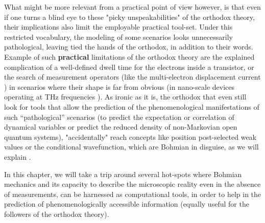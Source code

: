 \documentclass[11pt, a4paper]{article} %
\begin{document}
What might be more relevant from a practical point of view however, is that even if one turns a blind eye to these "picky unspeakabilities" of the orthodox theory, their implications also limit the employable practical tool-set. Under this restricted vocabulary, the modeling of some scenarios looks unnecessarily pathological, leaving tied the hands of the orthodox, in addition to their words. Example of such {\bf practical} limitations of the orthodox theory are the explained complication of a well-defined dwell time for the electrons inside a transistor, or the search of measurement operators (like the multi-electron displacement current \cite{equiv, Pel}) in scenarios where their shape is far from obvious (in nano-scale devices operating at THz frequencies \cite{Thz}). As ironic as it is, the orthodox that even still look for tools that allow the prediction of the phenomenological manifestations of such “pathological” scenarios (to predict the expectation or correlation of dynamical variables or predict the reduced density
of non-Markovian open quantum systems),  "accidentally" reach concepts like position post-selected weak values or the conditional wavefunction, which are Bohmian in disguise, as we will explain \cite{interpretSSE,NMisModal}.\vspace{-0.1cm}

In this chapter, we will take a trip around several hot-spots where Bohmian mechanics and its capacity to describe the microscopic reality even in the absence of measurements, can be harnessed as computational tools, in order to help in the prediction of phenomenologically accessible information (equally useful for the followers of the orthodox theory). %
\end{document}
